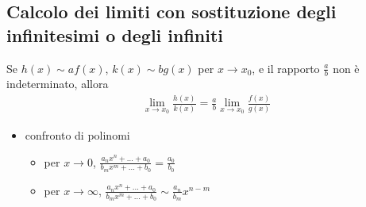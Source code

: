 \documentclass[letterpaper,10pt,italian]{jupyterBook}
\begin{document}
\subsection{Calcolo dei limiti con sostituzione degli infinitesimi o degli infiniti}
\label{\detokenize{ch/infinitesimal_calculus/analysis:calcolo-dei-limiti-con-sostituzione-degli-infinitesimi-o-degli-infiniti}}
\sphinxAtStartPar
Se \(h(x) \sim a f(x)\), \(k(x) \sim b g(x)\) per \(x \rightarrow x_0\), e il rapporto \(\frac{a}{b}\) non è indeterminato, allora
\begin{equation*}
\begin{split}\lim_{x \rightarrow x_0} \frac{h(x)}{k(x)} = \frac{a}{b} \lim_{x \rightarrow x_0} \frac{f(x)}{g(x)}\end{split}
\end{equation*}\begin{itemize}
\item {} 
\sphinxAtStartPar
confronto di polinomi
\begin{itemize}
\item {} 
\sphinxAtStartPar
per \(x \rightarrow 0\), \(\frac{a_n x^n + \dots + a_0}{b_m x^m + \dots + b_0} = \frac{a_0}{b_0}\)

\item {} 
\sphinxAtStartPar
per \(x \rightarrow \infty\), \(\frac{a_n x^n + \dots + a_0}{b_m x^m + \dots + b_0} \sim \frac{a_n}{b_m} x^{n-m}\)

\end{itemize}


\end{itemize}
\end{document}
